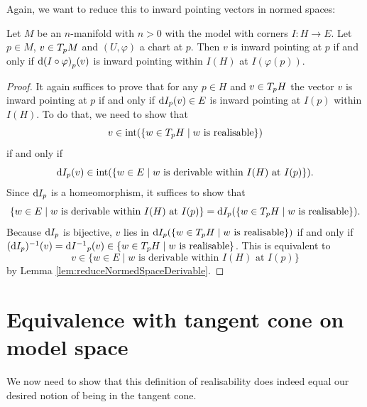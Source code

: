 Again, we want to reduce this to inward pointing vectors in normed spaces: 

\begin{lem}
Let $M$ be an $n$-manifold with $n > 0$ with the model with corners $I \colon H \to E$.  
Let $p \in M$, $v \in T_{p}M$ and $(U, \varphi)$ a chart at $p$. 
Then $v$ is inward pointing at $p$ if and only if $\text{d}{(I \circ \varphi)}_{p}(v)$ is inward pointing within $I(H)$ at $I(\varphi(p))$.
\end{lem}

\begin{proof}
It again suffices to prove that for any $p \in H$ and $v \in T_{p}H$ the vector $v$ is inward pointing at $p$ if and only if $\text{d}{I}_{p}(v) \in E$ is inward pointing at $I(p)$ within $I(H)$. 
To do that, we need to show that 
\begin{equation*}
v \in \text{int}(\{ w \in T_{p}H \mid w \text{ is realisable} \})
\end{equation*} 
if and only if
\begin{equation*}
\text{d}{I}_{p}(v) \in \text{int}(\{w \in E \mid w \text{ is derivable within } I(H) \text{ at } I(p)\}).
\end{equation*}
Since $\text{d}{I}_{p}$ is a homeomorphism, it suffices to show that 
\begin{equation*}
\{w \in E \mid w \text{ is derivable within } I(H) \text{ at } I(p)\}
= \text{d}{I}_{p}(\{ w \in T_{p}H \mid w \text{ is realisable} \}).
\end{equation*}
Because $\text{d}{I}_{p}$ is bijective, $v$ lies in $\text{d}{I}_{p}(\{ w \in T_{p}H \mid w \text{ is realisable} \})$ if and only if $(\text{d}{I}_{p})^{-1}(v) = \text{d}{I^{-1}}_{p}(v) \in \{ w \in T_{p}H \mid w \text{ is realisable} \}$. 
This is equivalent to 
\begin{equation*}
v \in \{w \in E \mid w \text{ is derivable within } I(H) \text{ at } I(p)\}
\end{equation*}
by Lemma \ref{lem:reduceNormedSpaceDerivable}.
\end{proof}

\section{Equivalence with tangent cone on model space}

We now need to show that this definition of realisability does indeed equal our desired notion of being in the tangent cone. 

